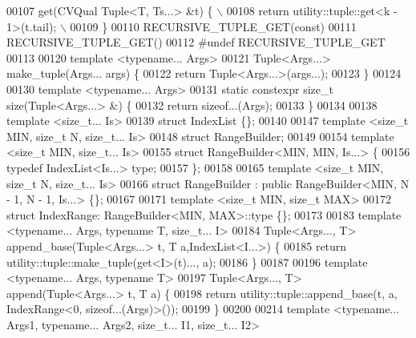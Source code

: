 \begin{DoxyCode}
00107 \textcolor{preprocessor}{get(CVQual Tuple<T, Ts...> &t) \{ \(\backslash\)}
00108 \textcolor{preprocessor}{  return utility::tuple::get<k - 1>(t.tail); \(\backslash\)}
00109 \textcolor{preprocessor}{\}}
00110 RECURSIVE\_TUPLE\_GET(\textcolor{keyword}{const})
00111 RECURSIVE\_TUPLE\_GET()
00112 \textcolor{preprocessor}{#undef RECURSIVE\_TUPLE\_GET}
00113 
00120 \textcolor{keyword}{template} <\textcolor{keyword}{typename}... Args>
00121 Tuple<Args...> make\_tuple(Args... args) \{
00122   \textcolor{keywordflow}{return} Tuple<Args...>(args...);
00123 \}
00124 
00130 \textcolor{keyword}{template} <\textcolor{keyword}{typename}... Args>
00131 \textcolor{keyword}{static} constexpr \textcolor{keywordtype}{size\_t} size(Tuple<Args...> &) \{
00132   \textcolor{keywordflow}{return} \textcolor{keyword}{sizeof}...(Args);
00133 \}
00134 
00138 \textcolor{keyword}{template} <\textcolor{keywordtype}{size\_t}... Is>
00139 \textcolor{keyword}{struct }IndexList \{\};
00140 
00147 \textcolor{keyword}{template} <\textcolor{keywordtype}{size\_t} MIN, \textcolor{keywordtype}{size\_t} N, \textcolor{keywordtype}{size\_t}... Is>
00148 \textcolor{keyword}{struct }RangeBuilder;
00149 
00154 \textcolor{keyword}{template} <\textcolor{keywordtype}{size\_t} MIN, \textcolor{keywordtype}{size\_t}... Is>
00155 \textcolor{keyword}{struct }RangeBuilder<MIN, MIN, Is...> \{
00156   \textcolor{keyword}{typedef} IndexList<Is...> type;
00157 \};
00158 
00165 \textcolor{keyword}{template} <\textcolor{keywordtype}{size\_t} MIN, \textcolor{keywordtype}{size\_t} N, \textcolor{keywordtype}{size\_t}... Is>
00166 \textcolor{keyword}{struct }RangeBuilder : \textcolor{keyword}{public} RangeBuilder<MIN, N - 1, N - 1, Is...> \{\};
00167 
00171 \textcolor{keyword}{template} <\textcolor{keywordtype}{size\_t} MIN, \textcolor{keywordtype}{size\_t} MAX>
00172 \textcolor{keyword}{struct }IndexRange: RangeBuilder<MIN, MAX>::type \{\};
00173 
00183 \textcolor{keyword}{template} <\textcolor{keyword}{typename}... Args, \textcolor{keyword}{typename} T, \textcolor{keywordtype}{size\_t}... I>
00184 Tuple<Args..., T> append\_base(Tuple<Args...> t, T a,IndexList<I...>) \{
00185   \textcolor{keywordflow}{return} utility::tuple::make\_tuple(get<I>(t)..., a);
00186 \}
00187 
00196 \textcolor{keyword}{template} <\textcolor{keyword}{typename}... Args, \textcolor{keyword}{typename} T>
00197 Tuple<Args..., T> append(Tuple<Args...> t, T a) \{
00198   \textcolor{keywordflow}{return} utility::tuple::append\_base(t, a,  IndexRange<0, \textcolor{keyword}{sizeof}...(Args)>());
00199 \}
00200 
00214 \textcolor{keyword}{template} <\textcolor{keyword}{typename}... Args1, \textcolor{keyword}{typename}... Args2, \textcolor{keywordtype}{size\_t}... I1, \textcolor{keywordtype}{size\_t}... I2>

\end{DoxyCode}
